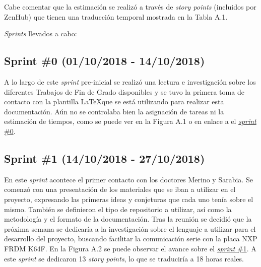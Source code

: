 Cabe comentar que la estimación se realizó a través de \textit{story points} (incluidos por ZenHub) que tienen una traducción temporal mostrada en la Tabla A.1.


\textit{Sprints} llevados a cabo:

\subsection{Sprint \#0 (01/10/2018 - 14/10/2018)}

A lo largo de este \textit{sprint} pre-inicial se realizó una lectura e investigación sobre los diferentes Trabajos de Fin de Grado disponibles  y se tuvo la primera toma de contacto con la plantilla \LaTeX  que se está utilizando para realizar esta documentación. Aún no se controlaba bien la asignación de tareas ni la estimación de tiempos, como se puede ver en la Figura A.1 o en enlace a el \href{https://github.com/FranBurgos/TFG/milestone/1?closed=1}{\textit{sprint} \#0}.


\subsection{Sprint \#1 (14/10/2018 - 27/10/2018)}

En este \textit{sprint} acontece el primer contacto con los doctores Merino y Sarabia. Se comenzó con una presentación de los materiales que se iban a utilizar en el proyecto, expresando las primeras ideas y conjeturas que cada uno tenía sobre el mismo. También se definieron el tipo de repositorio a utilizar, así como la metodología y el formato de la documentación. Tras la reunión se decidió que la próxima semana se dedicaría a la investigación sobre el lenguaje a utilizar para el desarrollo del proyecto, buscando facilitar la comunicación serie con la placa NXP FRDM K64F. En la Figura A.2 se puede observar el avance sobre el \href{https://github.com/FranBurgos/TFG/milestone/2?closed=1}{\textit{sprint} \#1}.  A este \textit{sprint} se dedicaron 13 \textit{story points}, lo que se traduciría a 18 horas reales.

